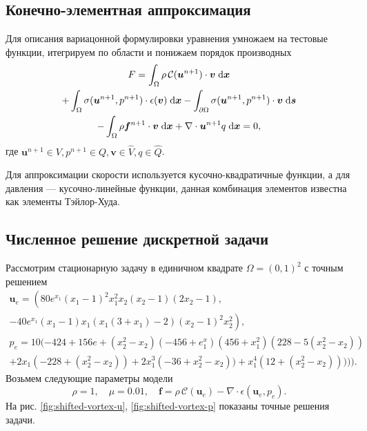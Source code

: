 \documentclass[a4paper,10pt]{report}
\begin{document}
\subsection{Конечно-элементная аппроксимация}

Для описания вариацонной формулировки уравнения умножаем на тестовые функции, итегрируем по области и понижаем порядок производных
\begin{equation}
\begin{gathered}
F = \int_\Omega \rho \,\mathcal{C}(\bm{u}^{n+1}) \cdot \bm{v} \;{\rm d}\bm{x} \\
 + \int_\Omega \sigma(\bm{u}^{n+1}, p^{n+1}) \cdot \epsilon(\bm{v}) \;{\rm d}\bm{x} 
 - \int_{\partial \Omega} \sigma(\bm{u}^{n+1}, p^{n+1}) \cdot \bm{v} \;{\rm d}\bm{s} \\
 - \int_\Omega \rho \bm{f}^{n+1} \cdot \bm{v} \;{\rm d}\bm{x} 
 + \nabla \cdot \bm{u}^{n+1} q \;{\rm d}\bm{x} = 0,
\end{gathered}
\label{eq:nonlinear-form}
\end{equation}
где $\bm{u}^{n+1} \in V, p^{n+1} \in Q, \bm{v} \in \widehat{V}, q \in \widehat{Q}$.

Для аппроксимации скорости используется кусочно-квадратичные функции, а для давления --- кусочно-линейные функции, данная комбинация элементов известна как элементы Тэйлор-Худа.

\subsection{Численное решение дискретной задачи}

Рассмотрим стационарную задачу в единичном квадрате $\Omega=(0,1)^2$ с точным решением
\begin{equation}
\begin{gathered}
\bm{u}_e = \left(80 e^{x_1}(x_1 - 1)^2 x_1^2 x_2 (x_2 -  1) (2 x_2 - 1),\right.\\
\left. -40 e^{x_1} (x_1 - 1) x_1 (x_1 (3 + x_1) - 2) (x_2-1)^2 x_2^2\right), \\
p_e = 10 (-424 + 156 e + (x_2^2-x_2) (-456 + e^x_1) (456 + x_1^2) (228 - 5 (x_2^2 - x_2)) \\
+ 2 x_1 (-228 + (x_2^2 - x_2)) + 2 x_1^3 (-36 + x_2^2 - x_2)) + x_1^4 (12 + (x_2^2 - x_2))))).
\end{gathered}
\label{eq:shifted-vortex}
\end{equation}
Возьмем следующие параметры модели
\[
\rho = 1, \quad \mu = 0.01, \quad \bm{f} = \rho \,\mathcal{C}(\bm{u}_e) - \nabla \cdot \epsilon(\bm{u}_e, p_e).
\]
На рис. \ref{fig:shifted-vortex-u}, \ref{fig:shifted-vortex-p} показаны точные решения задачи.
\end{document}

